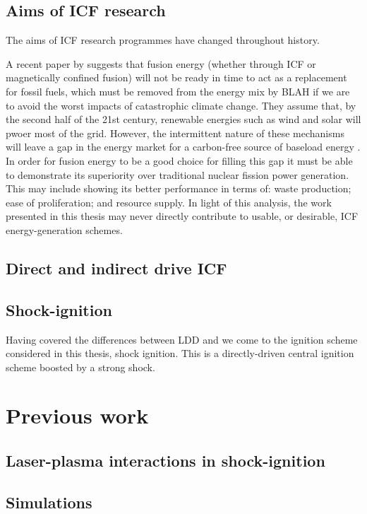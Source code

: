 \subsection{Aims of ICF research}

The aims of ICF research programmes have changed throughout history.

A recent paper by \citet{Nicholas2021} suggests that fusion energy (whether through ICF or magnetically confined fusion) will not be ready in time to act as a replacement for fossil fuels, which must be removed from the energy mix by BLAH if we are to avoid the worst impacts of catastrophic climate change. They assume that, by the second half of the 21st century, renewable energies such as wind and solar will pwoer most of the grid. However, the intermittent nature of these mechanisms will leave a gap in the energy market for a carbon-free source of baseload energy \citep{Nicholas2021}. In order for fusion energy to be a good choice for filling this gap it must be able to demonstrate its superiority over traditional nuclear fission power generation. This may include showing its better performance in terms of: waste production; ease of proliferation; and resource supply. In light of this analysis, the work presented in this thesis may never directly contribute to usable, or desirable, ICF energy-generation schemes.

\subsection{Direct and indirect drive ICF}

\subsection{Shock-ignition}
Having covered the differences between \acrshort{LDD} and  \citep{Ribeyre2009} we come to the ignition scheme considered in this thesis, shock ignition. This is a directly-driven central ignition scheme boosted by a strong shock.

\section{Previous work}
\subsection{Laser-plasma interactions in shock-ignition}
\subsection{Simulations}
